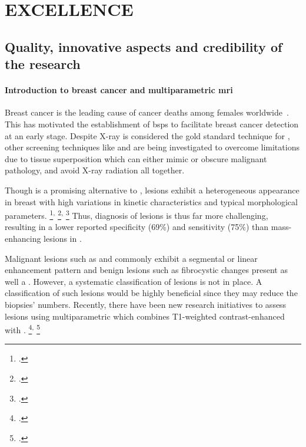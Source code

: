 \section{EXCELLENCE}
\label{sec:excellence}

\subsection{Quality, innovative aspects and credibility of the research}
\label{sec:quality}
\paragraph{Introduction to breast cancer and multiparametric \acs{mri}}

Breast cancer is the leading cause of cancer deaths among females
worldwide~\cite{cancerStatistics2011}. This has motivated the establishment of
\acp{bsp} to facilitate breast cancer detection at an early stage. Despite
X-ray \dm is considered the gold standard technique for \bsp, other screening
techniques like \us and \mri are being investigated to overcome \dm limitations
due to tissue superposition which can either mimic or obscure malignant
pathology, and avoid X-ray radiation all together.

Though \mri is a promising alternative to \dm, \nmle lesions exhibit
a heterogeneous appearance in breast \mri with high variations in kinetic
characteristics and typical morphological parameters.
\footcite{rosen2007birads}\textsuperscript{,}
\footcite{sakamoto2008categorization}\textsuperscript{,}
\footcite{yabuuchi2010nmle}
Thus, diagnosis of \nmle lesions is thus far more challenging,
resulting in a lower reported specificity (69\%) and sensitivity
(75$\%$) than mass-enhancing lesions\cite{liu2013intravoxel} in \cemri.

Malignant lesions such as \dci and \ilc commonly exhibit a segmental or linear
enhancement pattern and benign lesions such as fibrocystic changes present as
well a \nmle \cite{liu2013intravoxel}.  However, a systematic classification of \nmle
lesions is not in place. A classification of such lesions would be highly
beneficial since they may reduce the biopsies’ numbers.  Recently, there have
been new research initiatives to assess \nmle lesions using multiparametric
\mri which combines T1-weighted contrast-enhanced \mri with \dwi.
\footcite{pinker2013combined}\textsuperscript{,}
\footcite{yabuuchi2010nmle}

